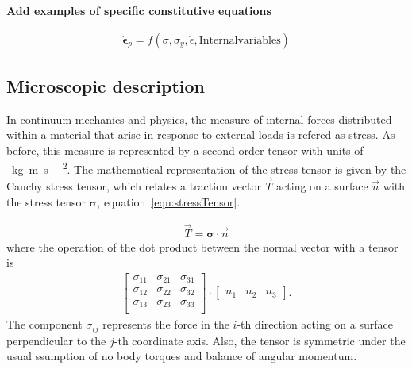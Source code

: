\textbf{Add examples of specific constitutive equations}

\begin{gather}
    \dot{\bm{\epsilon}}_{p} = f\left(\sigma,\sigma_y,\dot{\epsilon},\mathrm{Internal variables}\right)\label{eqn:viscoplastiEQN}
\end{gather}

\subsection{Microscopic description}

In continuum mechanics and physics, the measure of internal forces distributed within a material that arise in response to external loads is refered as stress.
As before, this measure is represented by a second-order tensor with units of \SI{}{\kilo\gram\per\meter\per\second\squared}.
The mathematical representation of the stress tensor is given by the Cauchy stress tensor, which relates a traction vector $\vec{T}$ acting on a surface $\vec{n}$ with the stress tensor $\bm{\sigma}$, equation~\eqref{eqn:stressTensor}.

\begin{gather}
    \vec{T} = \bm{\sigma}\cdot\vec{n}\label{eqn:stressTensor}
\end{gather}
where the operation of the dot product between the normal vector with a tensor is 
\begin{gather*}
    \begin{bmatrix}
        \sigma_{11} & \sigma_{21} & \sigma_{31} \\
        \sigma_{12} & \sigma_{22} & \sigma_{32} \\
        \sigma_{13} & \sigma_{23} & \sigma_{33} \\
    \end{bmatrix}
    \cdot
    \begin{bmatrix} n_1 & n_2 & n_3 \end{bmatrix}.
\end{gather*}
The component $\sigma_{ij}$ represents the force in the $i$-th direction acting on a surface perpendicular to the $j$-th coordinate axis.
Also, the tensor is symmetric under the usual ssumption of no body torques and balance of angular momentum.



